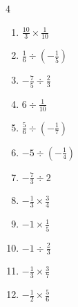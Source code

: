 \begin{multicols}{4}
\begin{enumerate}

  \item $\displaystyle \frac{10}{3}\times{}\frac{1}{10}$


  \item $\displaystyle \frac{1}{6}\div{}\left(-\frac{1}{5}\right)$


  \item $\displaystyle -\frac{7}{5}\div{}\frac{2}{3}$


  \item $\displaystyle 6\div{}\frac{1}{10}$

        \phantom{$\displaystyle =60$}

  \item $\displaystyle \frac{5}{6}\div{}\left(-\frac{1}{7}\right)$


  \item $\displaystyle -5\div{}\left(-\frac{1}{4}\right)$

        \phantom{$\displaystyle =20$}

  \item $\displaystyle -\frac{7}{3}\div{}2$


  \item $\displaystyle -\frac{1}{3}\times{}\frac{3}{4}$


  \item $\displaystyle -1\times{}\frac{1}{5}$


\columnbreak %

  \item $\displaystyle -1\div{}\frac{2}{3}$


  \item $\displaystyle -\frac{1}{3}\times{}\frac{3}{7}$


  \item $\displaystyle -\frac{1}{2}\times{}\frac{5}{6}$


\end{enumerate}
\end{multicols}

